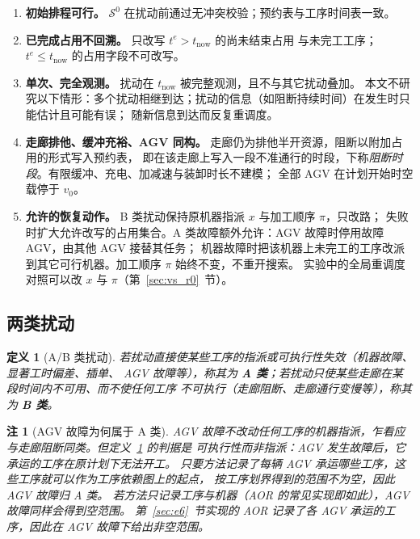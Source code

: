 \documentclass[manuscript,screen,review]{acmart}
\newtheorem{definition}{定义}
\newtheorem{remark}{注}
\begin{document}
\begin{enumerate}[label=\textbf{A\arabic*.},leftmargin=*,topsep=2pt,itemsep=2pt]
\item \textbf{初始排程可行。} \(\mathcal{S}^0\) 在扰动前通过无冲突校验；预约表与工序时间表一致。
\item \textbf{已完成占用不回溯。} 只改写 \(t^e>t_{\mathrm{now}}\) 的尚未结束占用
与未完工工序；\(t^e\le t_{\mathrm{now}}\) 的占用字段不可改写。
\item \textbf{单次、完全观测。} 扰动在 \(t_{\mathrm{now}}\) 被完整观测，且不与其它扰动叠加。
本文不研究以下情形：多个扰动相继到达；扰动的信息（如阻断持续时间）在发生时只能估计且可能有误；
随新信息到达而反复重调度。
\item \textbf{走廊排他、缓冲充裕、AGV 同构。} 走廊仍为排他半开资源，阻断以附加占用的形式写入预约表，
即在该走廊上写入一段不准通行的时段，下称\emph{阻断时段}。有限缓冲、充电、加减速与装卸时长不建模；
全部 AGV 在计划开始时空载停于 \(v_0\)。
\item \textbf{允许的恢复动作。} B 类扰动保持原机器指派 \(x\) 与加工顺序 \(\pi\)，只改路；
失败时扩大允许改写的占用集合。A 类故障额外允许：AGV 故障时停用故障 AGV，由其他 AGV 接替其任务；
机器故障时把该机器上未完工的工序改派到其它可行机器。加工顺序 \(\pi\) 始终不变，不重开搜索。
实验中的全局重调度对照可以改 \(x\) 与 \(\pi\)（第~\ref{sec:vs_r0}~节）。
\end{enumerate}

\subsection{两类扰动}
\label{sec:disturbance_classes}

\begin{definition}[A/B 类扰动]
\label{def:ab}
若扰动直接使某些工序的指派或\emph{可执行性}失效（机器故障、显著工时偏差、插单、
AGV 故障等），称其为 \textbf{A 类}；若扰动只使某些走廊在某段时间内不可用、而不使任何工序
不可执行（走廊阻断、走廊通行变慢等），称其为 \textbf{B 类}。
\end{definition}

\begin{remark}[AGV 故障为何属于 A 类]
\label{rem:agv_class}
AGV 故障不改动任何工序的机器指派，乍看应与走廊阻断同类。但定义~\ref{def:ab} 的判据是
\emph{可执行性}而非指派：AGV 发生故障后，它承运的工序在原计划下无法开工。
只要方法记录了每辆 AGV 承运哪些工序，这些工序就可以作为工序依赖图上的起点，
按工序划界得到的范围不为空，因此 AGV 故障归 A 类。
若方法只记录工序与机器（AOR 的常见实现即如此），AGV 故障同样会得到空范围。
第~\ref{sec:e6}~节实现的 AOR 记录了各 AGV 承运的工序，因此在 AGV 故障下给出非空范围。
\end{remark}
\end{document}
